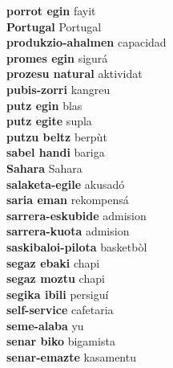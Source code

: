 \textbf{ porrot egin  } fayit \\
\textbf{ Portugal  } Portugal \\
\textbf{ produkzio-ahalmen  } capacidad \\
\textbf{ promes egin  } sigurá \\
\textbf{ prozesu natural  } aktividat \\
\textbf{ pubis-zorri  } kangreu \\
\textbf{ putz egin  } blas \\
\textbf{ putz egite  } supla \\
\textbf{ putzu beltz  } berpùt \\
\textbf{ sabel handi  } bariga \\
\textbf{ Sahara  } Sahara \\
\textbf{ salaketa-egile  } akusadó \\
\textbf{ saria eman  } rekompensá \\
\textbf{ sarrera-eskubide  } admision \\
\textbf{ sarrera-kuota  } admision \\
\textbf{ saskibaloi-pilota  } basketbòl \\
\textbf{ segaz ebaki  } chapi \\
\textbf{ segaz moztu  } chapi \\
\textbf{ segika ibili  } persiguí \\
\textbf{ self-service  } cafetaria \\
\textbf{ seme-alaba  } yu \\
\textbf{ senar biko  } bigamista \\
\textbf{ senar-emazte  } kasamentu \\
